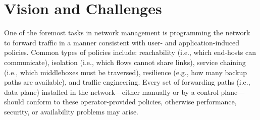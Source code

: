 \section{Vision and Challenges}

One of the foremost tasks in network management is programming the network to
forward traffic in a manner consistent with user- and application-induced
policies. Common types of policies include: reachability (i.e., which
end-hosts can communicate), isolation (i.e., which flows cannot share links),
service chaining (i.e., which middleboxes must be traversed), resilience
(e.g., how many backup paths are available), and traffic engineering. Every
set of forwarding paths (i.e., data plane) installed in the network---either
manually or by a control plane---should conform to these operator-provided
policies, otherwise performance, security, or availability problems may arise.

